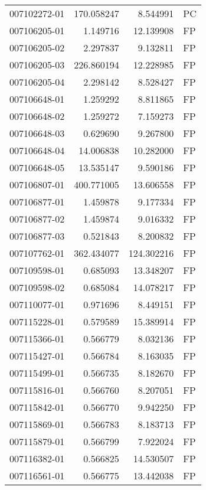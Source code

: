 \begin{tabular}{lrrl}
007102272-01 &  170.058247 &       8.544991 &   PC \\
007106205-01 &    1.149716 &      12.139908 &   FP \\
007106205-02 &    2.297837 &       9.132811 &   FP \\
007106205-03 &  226.860194 &      12.228985 &   FP \\
007106205-04 &    2.298142 &       8.528427 &   FP \\
007106648-01 &    1.259292 &       8.811865 &   FP \\
007106648-02 &    1.259272 &       7.159273 &   FP \\
007106648-03 &    0.629690 &       9.267800 &   FP \\
007106648-04 &   14.006838 &      10.282000 &   FP \\
007106648-05 &   13.535147 &       9.590186 &   FP \\
007106807-01 &  400.771005 &      13.606558 &   FP \\
007106877-01 &    1.459878 &       9.177334 &   FP \\
007106877-02 &    1.459874 &       9.016332 &   FP \\
007106877-03 &    0.521843 &       8.200832 &   FP \\
007107762-01 &  362.434077 &     124.302216 &   FP \\
007109598-01 &    0.685093 &      13.348207 &   FP \\
007109598-02 &    0.685084 &      14.078217 &   FP \\
007110077-01 &    0.971696 &       8.449151 &   FP \\
007115228-01 &    0.579589 &      15.389914 &   FP \\
007115366-01 &    0.566779 &       8.032136 &   FP \\
007115427-01 &    0.566784 &       8.163035 &   FP \\
007115499-01 &    0.566735 &       8.182670 &   FP \\
007115816-01 &    0.566760 &       8.207051 &   FP \\
007115842-01 &    0.566770 &       9.942250 &   FP \\
007115869-01 &    0.566783 &       8.183713 &   FP \\
007115879-01 &    0.566799 &       7.922024 &   FP \\
007116382-01 &    0.566825 &      14.530507 &   FP \\
007116561-01 &    0.566775 &      13.442038 &   FP \\

\end{tabular}
